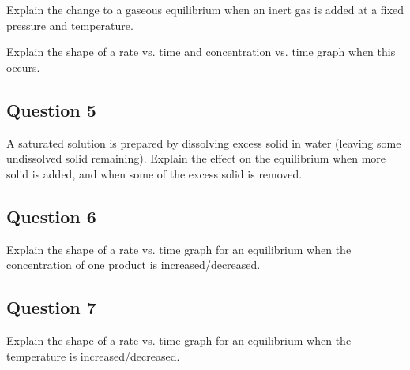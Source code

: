 \documentclass[a4paper,11pt]{article}
\begin{document}
Explain the change to a gaseous equilibrium when an inert gas is added at a
fixed pressure and temperature.

Explain the shape of a rate vs. time and concentration vs. time graph when this
occurs.


\subsection{Question 5}

A saturated solution is prepared by dissolving excess solid in water (leaving
some undissolved solid remaining). Explain the effect on the equilibrium when
more solid is added, and when some of the excess solid is removed.


\subsection{Question 6}

Explain the shape of a rate vs. time graph for an equilibrium when the
concentration of one product is increased/decreased.


\subsection{Question 7}

Explain the shape of a rate vs. time graph for an equilibrium when the
temperature is increased/decreased.
\end{document}
